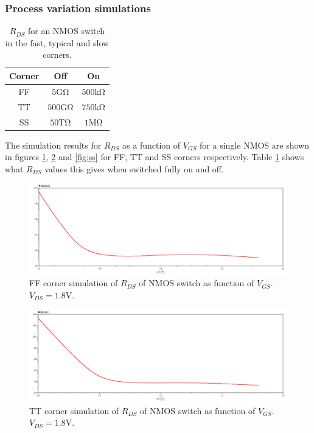 \subsubsection{Process variation simulations}

\begin{table}
    \centering
    \caption{$R_{DS}$ for an NMOS switch in the fast, typical and slow corners.}
    \label{tab:corners}
    \begin{tabular}{|c|c|c|}
        \hline
        Corner & Off & On \\
        \hline
        FF & $5 \mathrm{G\Omega}$ & $500 \mathrm{k\Omega}$ \\
        TT & $500 \mathrm{G\Omega}$ & $750 \mathrm{k\Omega}$ \\
        SS & $50 \mathrm{T\Omega}$ & $1 \mathrm{M\Omega}$ \\
        \hline
    \end{tabular}
\end{table}

The simulation results for $R_{DS}$ as a function of $V_{GS}$ for a single NMOS are shown in figures \ref{fig:ff}, \ref{fig:tt} and \ref{fig:ss} for FF, TT and SS corners respectively. Table \ref{tab:corners} shows what $R_{DS}$ values this gives when switched fully on and off.

\begin{figure}
    \centering
    \includegraphics[width=\textwidth]{graphs/corner_ff_simulation.png}
    \caption{FF corner simulation of $R_{DS}$ of NMOS switch as function of $V_{GS}$. $V_{DS} = 1.8\mathrm{V}$.}
    \label{fig:ff}
\end{figure}

\begin{figure}
    \centering
    \includegraphics[width=\textwidth]{graphs/corner_tt_simulation.png}
    \caption{TT corner simulation of $R_{DS}$ of NMOS switch as function of $V_{GS}$. $V_{DS} = 1.8\mathrm{V}$.}
    \label{fig:tt}
\end{figure}

